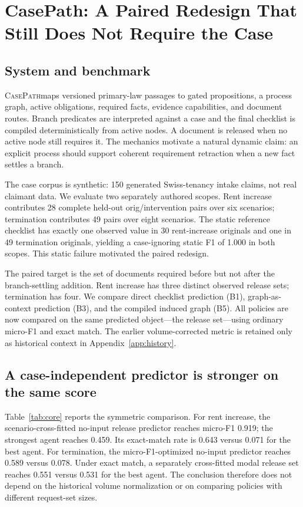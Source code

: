 \documentclass{article}
\newcommand{\casepath}{\textsc{CasePath}}
\begin{document}
\section{CasePath: A Paired Redesign That Still Does Not Require the Case}
\subsection{System and benchmark}
\casepath maps versioned primary-law passages to gated propositions, a process graph, active obligations, required facts, evidence capabilities, and document routes. Branch predicates are interpreted against a case and the final checklist is compiled deterministically from active nodes. A document is released when no active node still requires it. The mechanics motivate a natural dynamic claim: an explicit process should support coherent requirement retraction when a new fact settles a branch.

The case corpus is synthetic: 150 generated Swiss-tenancy intake claims, not real claimant data. We evaluate two separately authored scopes. Rent increase contributes 28 complete held-out orig/intervention pairs over six scenarios; termination contributes 49 pairs over eight scenarios. The static reference checklist has exactly one observed value in 30 rent-increase originals and one in 49 termination originals, yielding a case-ignoring static F1 of 1.000 in both scopes. This static failure motivated the paired redesign.

The paired target is the set of documents required before but not after the branch-settling addition. Rent increase has three distinct observed release sets; termination has four. We compare direct checklist prediction (B1), graph-as-context prediction (B3), and the compiled induced graph (B5). All policies are now compared on the same predicted object---the release set---using ordinary micro-F1 and exact match. The earlier volume-corrected metric is retained only as historical context in Appendix~\ref{app:history}.

\subsection{A case-independent predictor is stronger on the same score}
Table~\ref{tab:core} reports the symmetric comparison. For rent increase, the scenario-cross-fitted no-input release predictor reaches micro-F1 0.919; the strongest agent reaches 0.459. Its exact-match rate is 0.643 versus 0.071 for the best agent. For termination, the micro-F1-optimized no-input predictor reaches 0.589 versus 0.078. Under exact match, a separately cross-fitted modal release set reaches 0.551 versus 0.531 for the best agent. The conclusion therefore does not depend on the historical volume normalization or on comparing policies with different request-set sizes.
\end{document}
